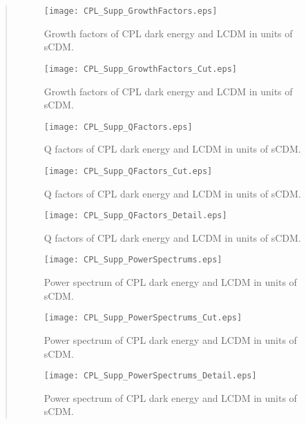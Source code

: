 \begin{quotation}
{\begin{enumerate}
\begin{figure}[!htpb]
\centering
\texttt{[image: CPL\_Supp\_GrowthFactors.eps]}
\caption{\color{blue}Growth factors of CPL dark energy and LCDM in units of sCDM.}\label{fig:CPL_Supp_GrowthFactors}
\end{figure}

\begin{figure}[!htpb]
\centering
\texttt{[image: CPL\_Supp\_GrowthFactors\_Cut.eps]}
\caption{\color{blue}Growth factors of CPL dark energy and LCDM in units of sCDM.}\label{fig:CPL_Supp_GrowthFactors_Cut}
\end{figure}




\begin{figure}[!htpb]
\centering
\texttt{[image: CPL\_Supp\_QFactors.eps]}
\caption{\color{blue}Q factors of CPL dark energy and LCDM in units of sCDM.}\label{fig:CPL_Supp_QFactors}
\end{figure}


\begin{figure}[!htpb]
\centering
\texttt{[image: CPL\_Supp\_QFactors\_Cut.eps]}
\caption{\color{blue}Q factors of CPL dark energy and LCDM in units of sCDM.}\label{fig:CPL_Supp_QFactors_Cut}
\end{figure}

\begin{figure}[!htpb]
\centering
\texttt{[image: CPL\_Supp\_QFactors\_Detail.eps]}
\caption{\color{blue}Q factors of CPL dark energy and LCDM in units of sCDM.}\label{fig:CPL_Supp_QFactors_Detail}
\end{figure}


\begin{figure}[!htpb]
\centering
\texttt{[image: CPL\_Supp\_PowerSpectrums.eps]}
\caption{\color{blue}Power spectrum of CPL dark energy and LCDM in units of sCDM.}\label{fig:CPL_Supp_PowerSpectrums}
\end{figure}


\begin{figure}[!htpb]
\centering
\texttt{[image: CPL\_Supp\_PowerSpectrums\_Cut.eps]}
\caption{\color{blue}Power spectrum of CPL dark energy and LCDM in units of sCDM.}\label{fig:CPL_Supp_PowerSpectrums_Cut}
\end{figure}


\begin{figure}[!htpb]
\centering
\texttt{[image: CPL\_Supp\_PowerSpectrums\_Detail.eps]}
\caption{\color{blue}Power spectrum of CPL dark energy and LCDM in units of sCDM.}\label{fig:CPL_Supp_PowerSpectrums_Detail}
\end{figure}


\end{enumerate}}
\end{quotation}
